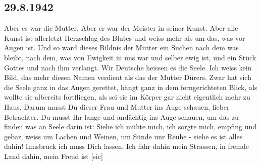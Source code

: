 \subsection{29.8.1942}

Aber es war die Mutter.
Aber er war der Meister in seiner Kunst.
Aber alle Kunst ist allerletzt Herzschlag des Blutes und weiss mehr als um das, was vor Augen ist.
Und so ward dieses Bildnis der Mutter ein Suchen nach dem was bleibt, nach dem, was von Ewigkeit in uns war und selber ewig ist, und ein St\"{u}ck Gottes und nach ihm verlangt.
Wir Deutsche heissen es die Seele.
Ich weiss kein Bild, das mehr diesen Namen verdient als das der Mutter D\"{u}rers.
Zwar hat sich die Seele ganz in das Augen gerettet, h\"{a}ngt ganz in dem ferngerichteten Blick, als wollte sie albereits fortfliegen, als sei sie im K\"{o}rper gar nicht eigentlich mehr zu Haus.
Darum musst Du dieser Frau und Mutter ins Auge schauen, lieber Betrachter.
Du musst Ihr lange und and\"{a}chtig ins Auge schauen, um das zu finden was an Seele darin ist: Siehe ich m\"{u}hte mich, ich sorgte mich, empfing und gebar, weiss um Lachen und Weinen, um S\"{u}nde unr Reuhe - siehe es ist alles dahin!
Innsbruck ich muss Dich lassen, Ich fahr dahin mein Strassen, in fremde Land dahin, mein Freud ist{\color{red} [sic] }


\clearpage
